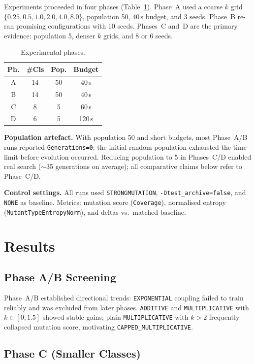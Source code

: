 \documentclass{IEEEtran}
\begin{document}
Experiments proceeded in four phases (Table~\ref{tab:phases}).
Phase~A used a coarse $k$ grid $\{0.25, 0.5, 1.0, 2.0, 4.0, 8.0\}$, population 50, 40\,s budget, and 3 seeds.
Phase~B re-ran promising configurations with 10 seeds.
Phases~C and~D are the primary evidence: population 5, denser $k$ grids, and 8 or 6 seeds.

\begin{table}[htbp]
\caption{Experimental phases.}
\label{tab:phases}
\centering
\small
\begin{tabular}{@{}cccc@{}}
\toprule
Ph. & \#Cls & Pop. & Budget \\
\midrule
A & 14 & 50 & 40\,s \\
B & 14 & 50 & 40\,s \\
C & 8 & 5 & 60\,s \\
D & 6 & 5 & 120\,s \\
\bottomrule
\end{tabular}
\end{table}

\textbf{Population artefact.}
With population 50 and short budgets, most Phase~A/B runs reported \texttt{Generations=0}: the initial random population exhausted the time limit before evolution occurred.
Reducing population to 5 in Phases~C/D enabled real search ($\sim$35 generations on average); all comparative claims below refer to Phase~C/D.

\textbf{Control settings.}
All runs used \texttt{STRONGMUTATION}, \texttt{-Dtest\_archive=false}, and \texttt{NONE} as baseline.
Metrics: mutation score (\texttt{Coverage}), normalised entropy (\texttt{MutantTypeEntropyNorm}), and deltas vs.\ matched baseline.

\section{Results}

\subsection{Phase A/B Screening}

Phase~A/B established directional trends:
\texttt{EXPONENTIAL} coupling failed to train reliably and was excluded from later phases.
\texttt{ADDITIVE} and \texttt{MULTIPLICATIVE} with $k \in [0, 1.5]$ showed stable gains; plain \texttt{MULTIPLICATIVE} with $k > 2$ frequently collapsed mutation score, motivating \texttt{CAPPED\_MULTIPLICATIVE}.

\subsection{Phase C (Smaller Classes)}
\end{document}
